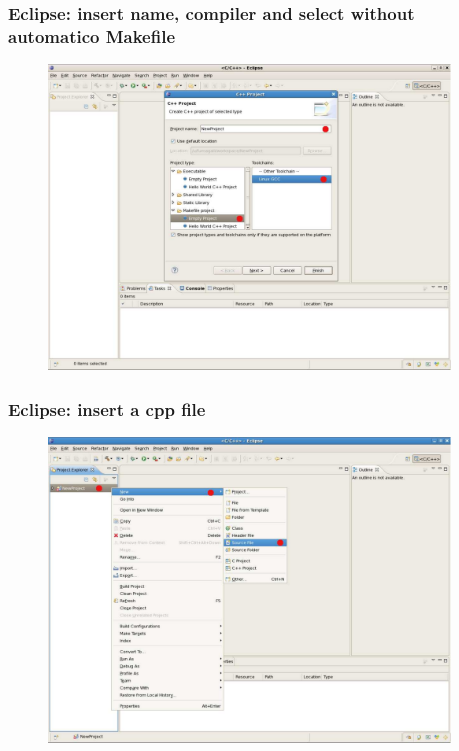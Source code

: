 \documentclass{beamer}
\begin{document}

\begin{frame}[fragile]

    \frametitle{Eclipse: insert name, compiler and select without automatico Makefile}

    \begin{figure}
        \centering
        \includegraphics[width=0.95\textwidth]{./images/eclipse2}
    \end{figure}

\end{frame}


\begin{frame}[fragile]

    \frametitle{Eclipse: insert a cpp file}

    \begin{figure}
        \centering
        \includegraphics[width=0.95\textwidth]{./images/eclipse3}
    \end{figure}

\end{frame}
\end{document}
